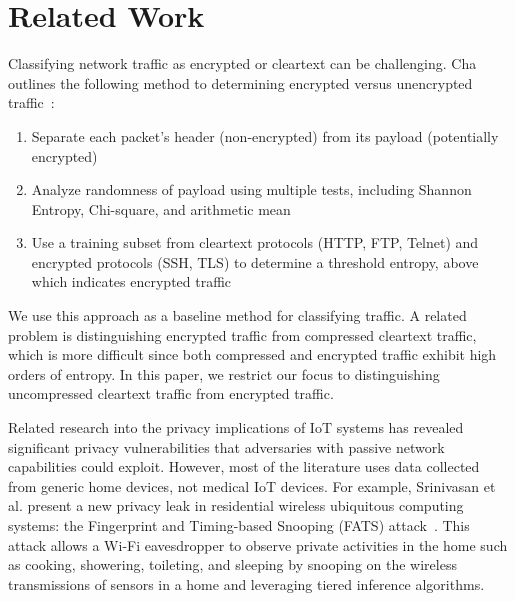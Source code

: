 \section{Related Work}

Classifying network traffic as
encrypted or cleartext can be challenging. Cha outlines the following
method to determining encrypted versus unencrypted traffic~\cite{chaMachineLearning}:
\begin{enumerate}
  \item Separate each packet's header (non-encrypted) from its payload (potentially encrypted)
  \item Analyze randomness of payload using multiple tests, including Shannon Entropy, Chi-square, and arithmetic mean
  \item Use a training subset from cleartext protocols (HTTP, FTP, Telnet) and encrypted protocols (SSH, TLS) to determine a threshold entropy, above which indicates encrypted traffic
\end{enumerate}
\noindent
We use this approach as a baseline method for classifying traffic. A related
problem is distinguishing encrypted traffic from compressed cleartext traffic,
which is more difficult since both compressed and encrypted traffic exhibit
high orders of entropy. In this paper, we restrict our focus to distinguishing
uncompressed cleartext traffic from encrypted traffic.

Related research into the privacy implications of IoT systems has revealed
significant privacy vulnerabilities that adversaries with passive network
capabilities could exploit. However, most of the literature uses data
collected from generic home devices, not medical IoT devices. For example, Srinivasan et al. present a new privacy
leak in residential wireless ubiquitous computing systems: the Fingerprint and
Timing-based Snooping (FATS) attack~\cite{srinivasan2008fats}.
This attack allows a Wi-Fi eavesdropper to
observe private activities in the home such as cooking, showering, toileting,
and sleeping by snooping on the wireless transmissions of sensors in a home
and leveraging tiered inference algorithms.

